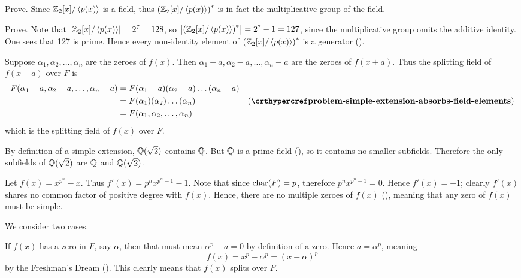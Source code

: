 \begin{questions}
\begin{partquestions}{\roman*}
        \item Prove. Since $\mathbb{Z}_2[x]/\left\langle p(x)\right\rangle$ is a field, thus $\left(\mathbb{Z}_2[x]/\left\langle p(x)\right\rangle\right)^\ast$ is in fact the multiplicative group of the field.
        
        \item Prove. Note that $\left|\mathbb{Z}_2[x]/\left\langle p(x)\right\rangle\right| = 2^7 = 128$, so $\left|\left(\mathbb{Z}_2[x]/\left\langle p(x)\right\rangle\right)^\ast\right| = 2^7 - 1 = 127$, since the multiplicative group omits the additive identity. One sees that 127 is prime. Hence every non-identity element of $\left(\mathbb{Z}_2[x]/\left\langle p(x)\right\rangle\right)^\ast$ is a generator ().
    \end{partquestions}
    
    \item Suppose $\alpha_1, \alpha_2, \dots, \alpha_n$ are the zeroes of $f(x)$. Then $\alpha_1 - a, \alpha_2 - a, \dots, \alpha_n - a$ are the zeroes of $f(x+a)$. Thus the splitting field of $f(x+a)$ over $F$ is
    \begin{align*}
        F(\alpha_1 - a, \alpha_2 - a, \dots, \alpha_n - a) &= F(\alpha_1 - a)(\alpha_2 - a)\dots(\alpha_n - a)\\
        &= F(\alpha_1)(\alpha_2)\dots(\alpha_n) & (\myref{problem-simple-extension-absorbs-field-elements})\\
        &= F(\alpha_1, \alpha_2, \dots, \alpha_n)
    \end{align*}
    which is the splitting field of $f(x)$ over $F$.
    
    \item By definition of a simple extension, $\mathbb{Q}(\sqrt2)$ contains $\mathbb{Q}$. But $\mathbb{Q}$ is a prime field (), so it contains no smaller subfields. Therefore the only subfields of $\mathbb{Q}(\sqrt2)$ are $\mathbb{Q}$ and $\mathbb{Q}(\sqrt2)$.
    
    \item Let $f(x) = x^{p^n} - x$. Thus $f'(x) = p^nx^{p^n-1}-1$. Note that since $\mathrm{char}(F) = p$, therefore $p^nx^{p^n-1} = 0$. Hence $f'(x) = -1$; clearly $f'(x)$ shares no common factor of positive degree with $f(x)$. Hence, there are no multiple zeroes of $f(x)$ (), meaning that any zero of $f(x)$ must be simple.
    
    \item We consider two cases.
    
    If $f(x)$ has a zero in $F$, say $\alpha$, then that must mean $\alpha^p - a = 0$ by definition of a zero. Hence $a = \alpha^p$, meaning
    \[
        f(x) = x^p - \alpha^p = (x-\alpha)^p
    \]
    by the Freshman's Dream (). This clearly means that $f(x)$ splits over $F$.


\end{questions}
